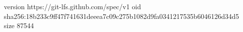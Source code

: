 version https://git-lfs.github.com/spec/v1
oid sha256:18b233c9ff47f741631deeea7c09c275b1082d9fa0341217535b6046126d34d5
size 87544
